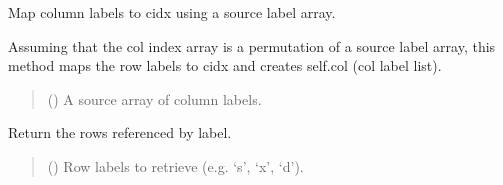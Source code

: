 \documentclass[letterpaper,12pt,english]{sphinxmanual}
\begin{document}
\begin{fulllineitems}
\begin{fulllineitems}
\begin{quote}
\begin{description}
\sphinxAtStartPar
{}

\end{description}\end{quote}

\end{fulllineitems}


\begin{fulllineitems}
\label{\detokenize{api/core:cbmpy.CBCommon.StructMatrix.setCol}}
\pysigstartsignatures
\pysiglinewithargsret
{}
{}
{}
\pysigstopsignatures
\sphinxAtStartPar
Map column labels to cidx using a source label array.

\sphinxAtStartPar
Assuming that the col index array is a permutation of a source label array,
this method maps the row labels to cidx and creates self.col (col label list).
\begin{quote}\begin{description}
\sphinxAtStartPar
{} () \textendash{} A source array of column labels.

\sphinxAtStartPar
{}

\end{description}\end{quote}

\end{fulllineitems}


\begin{fulllineitems}
\label{\detokenize{api/core:cbmpy.CBCommon.StructMatrix.getRowsByName}}
\pysigstartsignatures
\pysiglinewithargsret
{}
{}
{}
\pysigstopsignatures
\sphinxAtStartPar
Return the rows referenced by label.
\begin{quote}\begin{description}
\sphinxAtStartPar
{} () \textendash{} Row labels to retrieve (e.g. ‘s’, ‘x’, ‘d’).


\end{description}
\end{quote}
\end{fulllineitems}
\end{fulllineitems}
\end{document}
